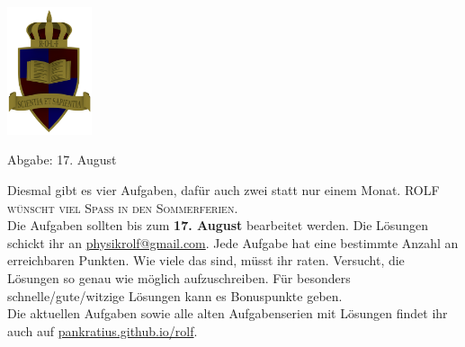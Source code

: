 \documentclass[a4paper]{article}
\begin{document}
	\vspace*{-2cm}
	\parbox{4cm}{\includegraphics[width=2.5cm]{../images/ROLF4.png}}
	\parbox{10.6cm}{ %
				 Abgabe: 17. August \\ \vspace*{-.5cm} }
	
	

\thispagestyle{empty}
\begin{framed}
	\noindent
	\scriptsize
	Diesmal gibt es vier Aufgaben, dafür auch zwei statt nur einem Monat. \textsc{ROLF wünscht viel Spaß in den Sommerferien.}\\
	Die Aufgaben sollten bis zum \textbf{17. August} bearbeitet werden. Die Lösungen schickt ihr an \href{mailto:physikrolf@gmail.com}{physikrolf@gmail.com}.
	Jede Aufgabe hat eine bestimmte Anzahl an erreichbaren Punkten. Wie viele das sind, müsst ihr raten. Versucht, die Lösungen so genau wie möglich aufzuschreiben. Für besonders schnelle/gute/witzige Lösungen kann es Bonuspunkte geben.\\ Die aktuellen Aufgaben sowie alle alten Aufgabenserien mit Lösungen findet ihr auch auf \url{pankratius.github.io/rolf}. %
\end{framed}

\noindent
\end{document}
